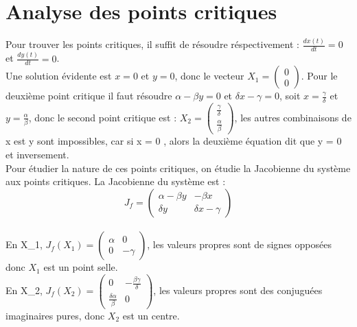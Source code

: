 \documentclass[a4paper,16pt,twoside]{report}
\begin{document}
\section{Analyse des points critiques}
Pour trouver les points critiques, il suffit de résoudre réspectivement : $\frac{dx(t)}{dt} = 0$ et $\frac{dy(t)}{dt} = 0$.\\
Une solution évidente est $x = 0$ et $y =0$, donc le vecteur $X_1 = \begin{pmatrix} 0\\0 \end{pmatrix}$. Pour le deuxième point critique il faut résoudre $\alpha - \beta y = 0$ et $\delta x - \gamma = 0$, soit $x = \frac{\gamma}{\delta}$ et $y = \frac{\alpha}{\beta}$, donc le second point critique est : $X_2 = \begin{pmatrix} \frac{\gamma}{\delta}\\ \frac{\alpha}{\beta} \end{pmatrix}$, les autres combinaisons de x est y sont impossibles, car si x = 0 , alors la deuxième équation dit que y = 0 et inversement.\\



Pour étudier la nature de ces points critiques, on étudie la Jacobienne du système aux points critiques. La Jacobienne du système est : 
\begin{equation}
    J_f = \begin{pmatrix} \alpha - \beta y & - \beta x \\ \delta y & \delta x - \gamma \end{pmatrix}
\end{equation}\\



En X_1, $J_f (X_1) =  \begin{pmatrix} \alpha & 0 \\ 0 & - \gamma \end{pmatrix}$, les valeurs propres sont de signes opposées donc $X_1$ est un point selle.\\



En X_2, $J_f(X_2) = \begin{pmatrix} 0 & - \frac{\beta \gamma}{\delta} \\ \frac{\delta \alpha}{\beta} & 0 \end{pmatrix}$, les valeurs propres sont des conjuguées imaginaires pures, donc $X_2$ est un centre.\\
\\
\\
\\
\end{document}
